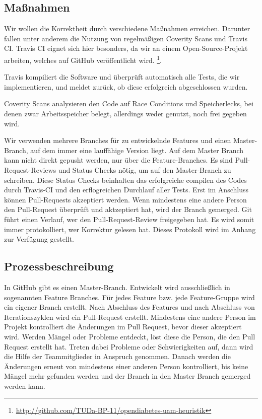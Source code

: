 \documentclass[accentcolor=tud0b,12pt,paper=a4]{tudreport}
\begin{document}
	\subsection{Maßnahmen}
Wir wollen die Korrektheit durch verschiedene Maßnahmen erreichen. Darunter fallen unter anderem die Nutzung von regelmäßigen Coverity Scans und Travis CI. Travis CI eignet sich hier besonders, da wir an einem Open-Source-Projekt arbeiten, welches auf GitHub veröffentlicht wird. \footnote{\url{http://github.com/TUDa-BP-11/opendiabetes-uam-heuristik}}.

Travis kompiliert die Software und überprüft automatisch alle Tests, die wir implementieren, und meldet zurück, ob diese erfolgreich abgeschlossen wurden. 

Coverity Scans analysieren den Code auf Race Conditions und Speicherlecks, bei denen zwar Arbeitsspeicher belegt, allerdings weder genutzt, noch frei gegeben wird. 

Wir verwenden mehrere Branches für zu entwickelnde Features und einen Master-Branch, auf dem immer eine lauffähige Version liegt. Auf dem Master Branch kann nicht direkt gepusht werden, nur über die Feature-Branches. Es sind Pull-Request-Reviews und Status Checks nötig, um auf den Master-Branch zu schreiben. Diese Status Checks beinhalten das erfolgreiche compilen des Codes durch Travis-CI und den erflogreichen Durchlauf aller Tests. Erst im Anschluss können Pull-Requests akzeptiert werden. Wenn mindestens eine andere Person den Pull-Request überprüft und aktzeptiert hat, wird der Branch gemerged. Git führt einen Verlauf, wer den Pull-Request-Review freigegeben hat. Es wird somit immer protokolliert, wer Korrektur gelesen hat. Dieses Protokoll wird im Anhang zur Verfügung gestellt.


	\subsection{Prozessbeschreibung}
In GitHub gibt es einen Master-Branch. Entwickelt wird ausschließlich in sogenannten Feature Branches. Für jedes Feature bzw. jede Feature-Gruppe wird ein eigener Branch erstellt. Nach Abschluss des Features und nach Abschluss von Iterationszyklen wird ein Pull-Request erstellt. Mindestens eine andere Person im Projekt kontrolliert die Änderungen im Pull Request, bevor dieser akzeptiert wird. Werden Mängel oder Probleme entdeckt, löst diese die Person, die den Pull Request erstellt hat. Treten dabei Probleme oder Schwierigkeiten auf, dann wird die Hilfe der Teammitglieder in Anspruch genommen. Danach werden die Änderungen erneut von mindestens einer anderen Person kontrolliert, bis keine Mängel mehr gefunden werden und der Branch in den Master Branch gemerged werden kann. 
\end{document}
